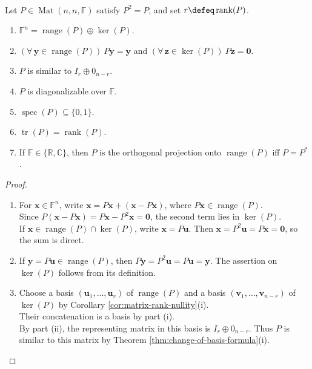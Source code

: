 \begin{proposition} \label{prop:idempotent-matrix-basic-invariants} \\
Let $P\in\operatorname{Mat}(n,n,\mathbb{F})$ satisfy $P^2=P$, and set $r\defeq\operatorname{rank}(P)$.
\begin{enumerate}[label=(\roman*)]
\setlength{\itemsep}{0pt}
\item $\mathbb{F}^n=\operatorname{range}(P)\oplus\ker(P)$.
\item $(\forall\,\mathbf{y}\in\operatorname{range}(P))\ P\mathbf{y}=\mathbf{y}$ and $(\forall\,\mathbf{z}\in\ker(P))\ P\mathbf{z}=\mathbf{0}$.
\item $P$ is similar to $I_r\oplus0_{n-r}$.
\item $P$ is diagonalizable over $\mathbb{F}$.
\item $\operatorname{spec}(P)\subseteq\{0,1\}$.
\item $\operatorname{tr}(P)=\operatorname{rank}(P)$.
\item If $\mathbb{F}\in\{\mathbb{R},\mathbb{C}\}$, then $P$ is the orthogonal projection onto $\operatorname{range}(P)$ iff $P=P^*$.
\end{enumerate}
\begin{proof}
\begin{enumerate}[label=(\roman*)]
\setlength{\itemsep}{0pt}
\item[$(i)$] For $\mathbf{x}\in\mathbb{F}^n$, write $\mathbf{x}=P\mathbf{x}+(\mathbf{x}-P\mathbf{x})$, where $P\mathbf{x}\in\operatorname{range}(P)$.\\
Since $P(\mathbf{x}-P\mathbf{x})=P\mathbf{x}-P^2\mathbf{x}=\mathbf{0}$, the second term lies in $\ker(P)$.\\
If $\mathbf{x}\in\operatorname{range}(P)\cap\ker(P)$, write $\mathbf{x}=P\mathbf{u}$. Then $\mathbf{x}=P^2\mathbf{u}=P\mathbf{x}=\mathbf{0}$, so the sum is direct.
\item[$(ii)$] If $\mathbf{y}=P\mathbf{u}\in\operatorname{range}(P)$, then $P\mathbf{y}=P^2\mathbf{u}=P\mathbf{u}=\mathbf{y}$. The assertion on $\ker(P)$ follows from its definition.
\item[$(iii)$] Choose a basis $(\mathbf{u}_1,\ldots,\mathbf{u}_r)$ of $\operatorname{range}(P)$ and a basis $(\mathbf{v}_1,\ldots,\mathbf{v}_{n-r})$ of $\ker(P)$ by Corollary \ref{cor:matrix-rank-nullity}(i).\\
Their concatenation is a basis by part (i).\\
By part (ii), the representing matrix in this basis is $I_r\oplus0_{n-r}$. Thus $P$ is similar to this matrix by Theorem \ref{thm:change-of-basis-formula}(i).

\end{enumerate}
\end{proof}
\end{proposition}
